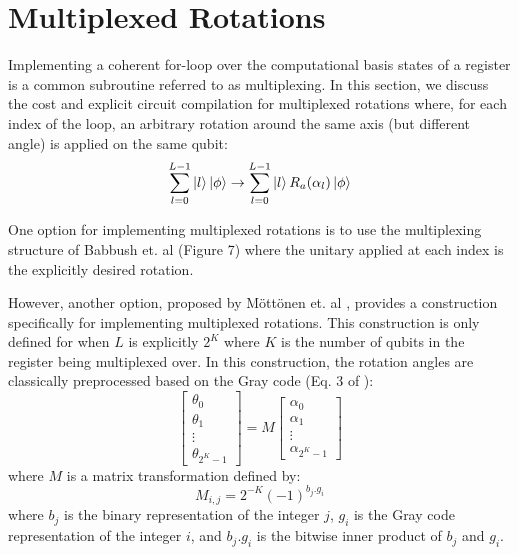 \section{Multiplexed Rotations}
\label{sec:multiplexed-rotations}

Implementing a coherent for-loop over the computational basis states of a register is a common subroutine referred to as multiplexing.
In this section, we discuss the cost and explicit circuit compilation for multiplexed rotations where, for each index of the loop, an arbitrary rotation around the same axis (but different angle) is applied on the same qubit:
\begin{equation}
    \sum_{l=0}^{L - 1} \ket{l} \ket{\phi} \rightarrow \sum_{l=0}^{L - 1} \ket{l} R_a (\alpha_l) \ket{\phi}
\end{equation}

One option for implementing multiplexed rotations is to use the multiplexing structure of Babbush et. al \cite{babbush2018encoding} (Figure 7) where the unitary applied at each index is the explicitly desired rotation.

However, another option, proposed by Möttönen et. al \cite{mottonen2004transformation}, provides a construction specifically for implementing multiplexed rotations.
This construction is only defined for when $L$ is explicitly $2^K$ where $K$ is the number of qubits in the register being multiplexed over.
In this construction, the rotation angles are classically preprocessed based on the Gray code (Eq. 3 of \cite{mottonen2004transformation}):
\begin{equation}
    \begin{bmatrix}
        \theta_{0} \\
        \theta_{1} \\
        \vdots \\
        \theta_{2^K - 1}
    \end{bmatrix} = M \begin{bmatrix}
        \alpha_{0} \\
        \alpha_{1} \\
        \vdots \\
        \alpha_{2^K - 1}
    \end{bmatrix}
\end{equation}
where $M$ is a matrix transformation defined by:
\begin{equation}
    M_{i, j} = 2^{-K} (-1)^{b_{j} . g_{i}}
\end{equation}
where $b_j$ is the binary representation of the integer $j$, $g_i$ is the Gray code representation of the integer $i$, and $b_{j} . g_{i}$ is the bitwise inner product of $b_{j}$ and $g_{i}$.

